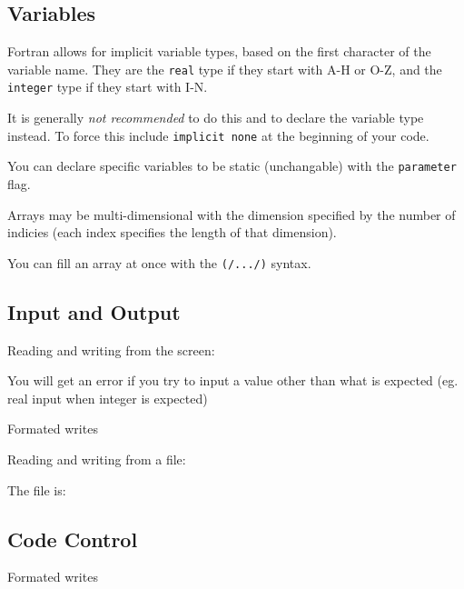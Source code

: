 \subsection{Variables}
Fortran allows for implicit variable types, based on the first character of the variable name. They are the \texttt{real} type if they start with A-H or O-Z, and the \texttt{integer} type if they start with I-N.

It is generally \emph{not recommended} to do this and to declare the variable type instead. To force this include \texttt{implicit none} at the beginning of your code.

You can declare specific variables to be static (unchangable) with the \texttt{parameter} flag.

Arrays may be multi-dimensional with the dimension specified by the number of indicies (each index specifies the length of that dimension).

You can fill an array at once with the \texttt{(/.../)} syntax.
\begin{quote}

\end{quote}


\subsection{Input and Output}
Reading and writing from the screen:
\begin{quote}

\end{quote}
\noindent You will get an error if you try to input a value other than what is expected (eg. real input when integer is expected)

Formated writes
\begin{quote}

\end{quote}

\noindent Reading and writing from a file:
\begin{quote}

\end{quote}
\noindent The file is:
\begin{quote}

\end{quote}

\subsection{Code Control}
Formated writes
\begin{quote}

\end{quote}
